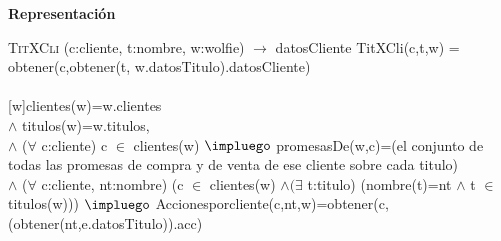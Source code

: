 \documentclass[10pt, a4paper]{article}
\let\NombreFuncion=\textsc
\newenvironment{Representacion}{%
  \vspace*{2ex}%
  \noindent\textbf{\Large Representaci\'{o}n}%
  \vspace*{2ex}%
}{}
\begin{document}
\begin{Representacion}
{  }\mbox{} 
    
  \NombreFuncion{TitXCli} (c:cliente, t:nombre, w:wolfie) $\rightarrow$ datosCliente
  TitXCli(c,t,w) = obtener(c,obtener(t, w.datosTitulo).datosCliente) \\ \\
   [w]{clientes(w)=w.clientes\\$\wedge$ titulos(w)=w.titulos,\\$\wedge$ ($\forall$ c:cliente) c $\in$ clientes(w) $\impluego$ promesasDe(w,c)=(el conjunto de todas las promesas de compra y de venta de ese cliente sobre cada titulo)\\$\wedge$ ($\forall$ c:cliente, nt:nombre) (c $\in$ clientes(w) $\wedge (\exists$ t:titulo) (nombre(t)=nt $\wedge$ t $\in$ titulos(w))) $\impluego$ Accionesporcliente(c,nt,w)=obtener(c,(obtener(nt,e.datosTitulo)).acc)}


\end{Representacion}
\end{document}
